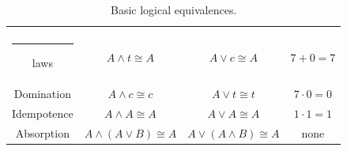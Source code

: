 \begin{table}[hbt]
\begin{center}
\begin{tabular}{c|c|c|c}
\begin{minipage}{.25\textwidth} \rule{0pt}{22pt}\index{identity law}Identity \\ \rule{12pt}{0pt} laws\rule[-10pt]{0pt}{10pt} \end{minipage} & 
\begin{minipage}{.25\textwidth} \centerline{$A \land t \cong A$} \end{minipage} & 
\begin{minipage}{.25\textwidth} \centerline{$A \lor c \cong A$} \end{minipage} & 
\begin{minipage}{.25\textwidth} \centerline{$7 + 0 = 7$} \end{minipage}\\ \hline 
\begin{minipage}{.25\textwidth} \rule{0pt}{22pt}\index{domination law}Domination\rule[-10pt]{0pt}{10pt} \end{minipage} & 
\begin{minipage}{.25\textwidth}  \centerline{$A \land c \cong c$} \end{minipage} & 
\begin{minipage}{.25\textwidth} \centerline{$A \lor t \cong t$} \end{minipage} & 
\begin{minipage}{.25\textwidth} \centerline{$7 \cdot 0 = 0$} \end{minipage}\\ \hline
\begin{minipage}{.25\textwidth} \rule{0pt}{22pt}\index{idempotence}Idempotence\rule[-10pt]{0pt}{10pt} \end{minipage} & 
\begin{minipage}{.25\textwidth} \centerline{$A \land A \cong A$} \end{minipage} & 
\begin{minipage}{.25\textwidth} \centerline{$A \lor A \cong A$} \end{minipage} & 
\begin{minipage}{.25\textwidth} \centerline{$ 1 \cdot 1 = 1$} \end{minipage} \\ \hline
\begin{minipage}{.25\textwidth} \rule{0pt}{22pt}\index{absorption}Absorption\rule[-10pt]{0pt}{10pt} \end{minipage} & 
\begin{minipage}{.25\textwidth} \centerline{$A \land (A \lor B) \cong A$} \end{minipage} & 
\begin{minipage}{.25\textwidth} \centerline{$A \lor (A \land B) \cong A$} \end{minipage} & none \\ 
\end{tabular} 
\end{center} 
\caption{Basic logical equivalences. }
\label{tab:bool_equiv}
\end{table}

